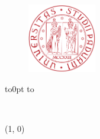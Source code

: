 \documentclass[
  10pt,       %
  twoside,    %
  a4paper,    %
  english,    %
  tikz,       %
  openright,  %
]{book}
\begin{document}
\begin{titlepage}
  \begin{center}

    \begin{figure}[htbp]
      \centering
      \includegraphics[height=3cm]{unipd-logo}
    \end{figure}

    \vbox to0pt{
      \vbox to
      \vss}

    \begin{huge}
      \textbf{\myUni}\\
    \end{huge}

    \line(1, 0){\textwidth} \\
    
    \begin{Large}
      \textsc{\myDepartment}\\
    \end{Large}
    
    \vspace{10pt}
    

\end{center}
\end{titlepage}
\end{document}
